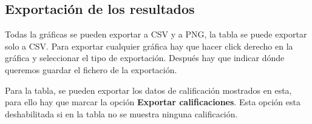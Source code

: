 \subsection{Exportación de los resultados}
Todas la gráficas se pueden exportar a CSV y a PNG, la tabla se puede exportar solo a CSV. Para exportar cualquier gráfica hay que hacer click derecho en la gráfica y seleccionar el tipo de exportación. Después hay que indicar dónde queremos guardar el fichero de la exportación.

Para la tabla, se pueden exportar los datos de calificación mostrados en esta, para ello hay que marcar la opción \textbf{Exportar calificaciones}. Esta opción esta deshabilitada si en la tabla no se muestra ninguna calificación.